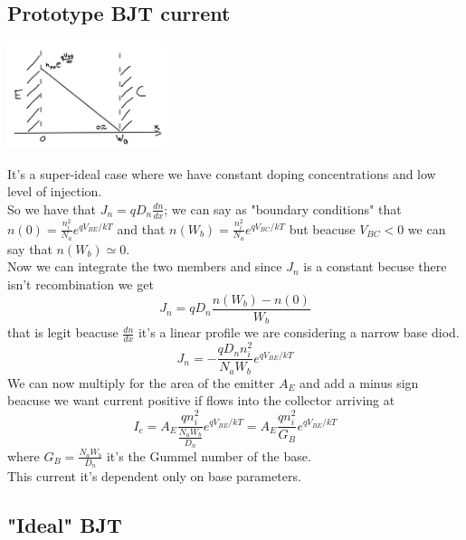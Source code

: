 \subsection{Prototype BJT current}

\centering
\includegraphics[width=0.35\textwidth]{bjt4.png}\\
\raggedright

It's a super-ideal case where we have constant doping concentrations and low level of injection.\\
So we have that $J_n=qD_n \frac{dn}{dx}$; we can say as "boundary conditions" that $n(0)=\frac{n_i^2}{N_a}e^{qV_{BE}/kT}$ and that $n(W_b)=\frac{n_i^2}{N_a}e^{qV_{BC}/kT}$ but beacuse $V_{BC}<0$ we can say that $n(W_b)\simeq 0$.\\
Now we can integrate the two members and since $J_n$ is a constant becuse there isn't recombination we get
\begin{equation}
J_n=qD_n\frac{n(W_b)-n(0)}{W_b}
\end{equation}
that is legit beacuse $\frac{dn}{dx}$ it's a linear profile we are considering a narrow base diod.\\
\begin{equation}
J_n=-\frac{qD_nn_i^2}{N_aW_b}e^{qV_{BE}/kT}
\end{equation}
We can now multiply for the area of the emitter $A_E$ and add a minus sign beacuse we want current positive if flows into the collector arriving at
\begin{equation}
I_c=A_E\frac{qn_i^2}{\frac{N_aW_b}{D_n}}e^{qV_{BE}/kT}=A_E\frac{qn_i^2}{G_B}e^{qV_{BE}/kT}
\end{equation}
where $G_B=\frac{N_aW_b}{D_n}$ it's the Gummel number of the base.\\
This current it's dependent only on base parameters.

\subsection{"Ideal" BJT}

